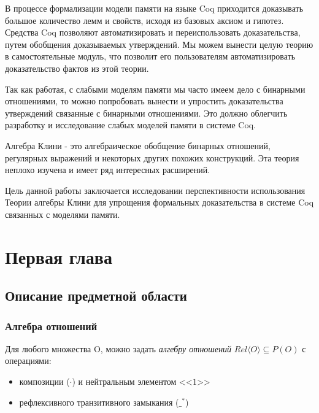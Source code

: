 \documentclass[times
              ]{itmo-student-thesis}
\begin{document}
В процессе формализации модели памяти на языке Coq приходится доказывать большое количество лемм и свойств, исходя из базовых аксиом и гипотез. Средства Coq позволяют автоматизировать и переиспользовать доказательства, путем обобщения доказываемых утверждений. Мы можем вынести целую теорию в самостоятельные модуль, что позволит его пользователям автоматизировать доказательство фактов из этой теории.

Так как работая, с слабыми моделям памяти мы часто имеем дело с бинарными отношениями, то можно попробовать вынести и упростить доказательства утверждений связанные с бинарными отношениями.  Это должно облегчить разработку и исследование слабых моделей памяти в системе Coq.

Алгебра Клини - это алгебраическое обобщение бинарных отношений, регулярных выражений и некоторых других похожих конструкций. Эта теория неплохо изучена и имеет ряд интересных расширений.

Цель данной работы заключается исследовании перспективности использования Теории алгебры Клини для упрощения формальных доказательства в системе Coq связанных с моделями памяти.

\chapter{Первая глава}
  \section{Описание предметной области}



    \subsection{Алгебра отношений}
      Для любого множества O, можно задать \textit{алгебру отношений} $\mathit{Rel}\langle O \rangle \subseteq P(O) $ с операциями:
      \begin{itemize}
        \item композиции ($ \cdot $) и нейтральным элементом <<$1$>>
        \item рефлексивного транзитивного замыкания ($ \_^* $)
      \end{itemize}
\end{document}
